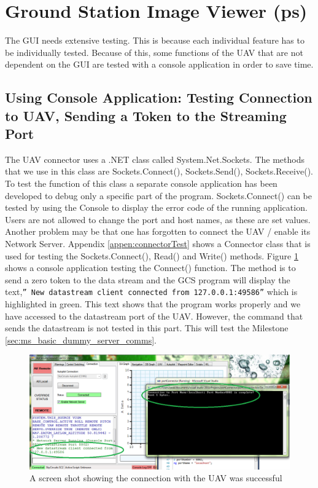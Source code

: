 \section{Ground Station Image Viewer (ps)}
\label{sec:ground_station_image_viewer}
The GUI needs extensive testing. This is because each individual feature has to be individually tested. Because of this, some functions of the UAV that are not dependent on the GUI are tested with a console application in order to save time.
\subsection{Using Console Application: Testing Connection to UAV, Sending a Token to the Streaming Port}
\label{sec:testing_connection_send_to_stream}
The UAV connector uses a .NET class called System.Net.Sockets. The methods that we use in this class are Sockets.Connect(), Sockets.Send(), Sockets.Receive(). To test the function of this class a separate console application has been developed to debug only a specific part of the program. Sockets.Connect() can be tested by using the Console to display the error code of the running application. Users are not allowed to change the port and host names, as these are set values. Another problem may be that one has forgotten to connect the UAV / enable its Network Server. Appendix \ref{appen:connectorTest} shows a Connector class that is used for testing the Sockets.Connect(), Read() and Write() methods.
Figure \ref{connect to Stream Port} shows a console application testing the Connect() function. 
The method is to send a zero token to the data stream and the GCS program will display the text,\texttt{''\* New datastream client connected from 127.0.0.1:49586''} which is highlighted in green. 
This text shows that the program works properly and we have accessed to the datastream port of the UAV.
However, the command that sends the datastream is not tested in this part. 
This will test the Milestone \ref{sec:ms_basic_dummy_server_comms}.
\begin{figure}[H]
\begin{center}
\includegraphics[width=1.00\textwidth]{testing_screenshots/test_sending.png} 
\end{center}
\caption{A screen shot showing the connection with the UAV was successful\label{connect to Stream Port}}
\end{figure}

